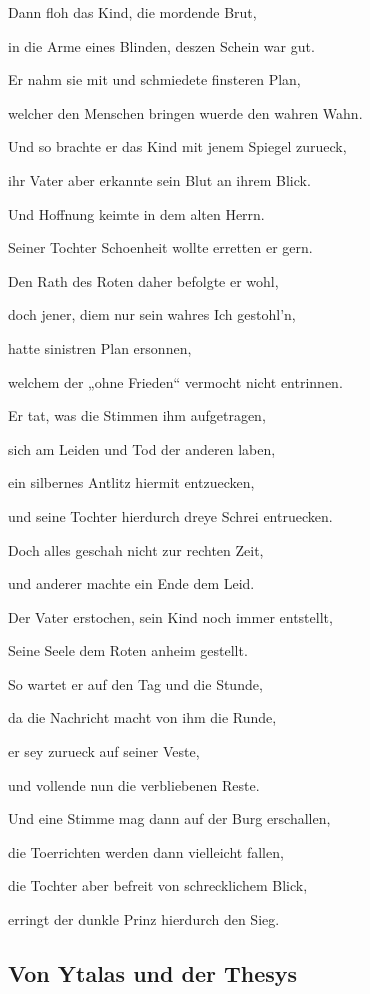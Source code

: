 \documentclass[a5paper,8pt]{book}
\begin{document}
Dann floh das Kind, die mordende Brut,

in die Arme eines Blinden, deszen Schein war gut.

Er nahm sie mit und schmiedete finsteren Plan, 

welcher den Menschen bringen wuerde den wahren Wahn.

Und so brachte er das Kind mit jenem Spiegel zurueck,

ihr Vater aber erkannte sein Blut an ihrem Blick.

Und Hoffnung keimte in dem alten Herrn.

Seiner Tochter Schoenheit wollte erretten er gern.

Den Rath des Roten daher befolgte er wohl, 

doch jener, diem nur sein wahres Ich gestohl’n, 

hatte sinistren Plan ersonnen,

welchem der „ohne Frieden“ vermocht nicht entrinnen.

Er tat, was die Stimmen ihm aufgetragen,

sich am Leiden und Tod der anderen laben,

ein silbernes Antlitz hiermit entzuecken,

und seine Tochter hierdurch dreye Schrei entruecken.

Doch alles geschah nicht zur rechten Zeit, 

und anderer machte ein Ende dem Leid.

Der Vater erstochen, sein Kind noch immer entstellt,

Seine Seele dem Roten anheim gestellt.

So wartet er auf den Tag und die Stunde,

da die Nachricht macht von ihm die Runde,

er sey zurueck auf seiner Veste,

und vollende nun  die verbliebenen Reste.

Und eine Stimme mag dann auf der Burg erschallen,

die Toerrichten werden dann vielleicht fallen,

die Tochter aber befreit von schrecklichem Blick,

erringt der dunkle Prinz hierdurch den Sieg.

\newpage

\subsection{ Von Ytalas und der Thesys}
\end{document}

